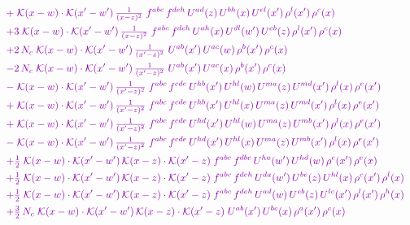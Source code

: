 \documentclass[10pt]{article}
\numberwithin{equation}{section}
\begin{document}
\begin{align}
&\quad{\color{CC}+\;\mathcal{K}(x-w)\cdot\mathcal{K}(x'-w')\,\tfrac{1}{(x-z)^{2}}\;f^{abc}\,f^{deh}\,U^{ad}(z)\,U^{bh}(x)\,U^{el}(x')\,\rho^{l}(x')\,\rho^{c}(x)}\notag\\
&\quad{\color{CC}+3\;\mathcal{K}(x-w)\cdot\mathcal{K}(x'-w')\,\tfrac{1}{(x-z)^{2}}\;f^{abc}\,f^{deh}\,U^{ah}(x)\,U^{dl}(w')\,U^{eb}(z)\,\rho^{l}(x')\,\rho^{c}(x)}\notag\\
&\quad{\color{CC}+2\,N_c\;\mathcal{K}(x-w)\cdot\mathcal{K}(x'-w')\,\tfrac{1}{(x'-z)^{2}}\;U^{ab}(x')\,U^{ac}(w)\,\rho^{b}(x')\,\rho^{c}(x)}\notag\\
&\quad{\color{CC}-2\,N_c\;\mathcal{K}(x-w)\cdot\mathcal{K}(x'-w')\,\tfrac{1}{(x'-z)^{2}}\;U^{ab}(x')\,U^{ac}(x)\,\rho^{b}(x')\,\rho^{c}(x)}\notag\\
&\quad{\color{CC}-\;\mathcal{K}(x-w)\cdot\mathcal{K}(x'-w')\,\tfrac{1}{(x'-z)^{2}}\;f^{abc}\,f^{cde}\,U^{hb}(x')\,U^{hl}(w)\,U^{ma}(z)\,U^{md}(x')\,\rho^{l}(x)\,\rho^{e}(x')}\notag\\
&\quad{\color{CC}+\;\mathcal{K}(x-w)\cdot\mathcal{K}(x'-w')\,\tfrac{1}{(x'-z)^{2}}\;f^{abc}\,f^{cde}\,U^{hb}(x')\,U^{hl}(x)\,U^{ma}(z)\,U^{md}(x')\,\rho^{l}(x)\,\rho^{e}(x')}\notag\\
&\quad{\color{CC}+\;\mathcal{K}(x-w)\cdot\mathcal{K}(x'-w')\,\tfrac{1}{(x'-z)^{2}}\;f^{abc}\,f^{cde}\,U^{hd}(x')\,U^{hl}(w)\,U^{ma}(z)\,U^{mb}(x')\,\rho^{l}(x)\,\rho^{e}(x')}\notag\\
&\quad{\color{CC}-\;\mathcal{K}(x-w)\cdot\mathcal{K}(x'-w')\,\tfrac{1}{(x'-z)^{2}}\;f^{abc}\,f^{cde}\,U^{hd}(x')\,U^{hl}(x)\,U^{ma}(z)\,U^{mb}(x')\,\rho^{l}(x)\,\rho^{e}(x')}\notag\\
&\quad{\color{CC}+\tfrac{1}{2}\;\mathcal{K}(x-w)\cdot\mathcal{K}(x'-w')\,\mathcal{K}(x-z)\cdot\mathcal{K}(x'-z)\;f^{abc}\,f^{dbe}\,U^{ha}(w')\,U^{hd}(w)\,\rho^{c}(x')\,\rho^{e}(x)}\notag\\
&\quad{\color{CC}+\tfrac{1}{2}\;\mathcal{K}(x-w)\cdot\mathcal{K}(x'-w')\,\mathcal{K}(x-z)\cdot\mathcal{K}(x'-z)\;f^{abc}\,f^{deh}\,U^{da}(w')\,U^{be}(z)\,U^{hl}(x)\,\rho^{c}(x')\,\rho^{l}(x)}\notag\\
&\quad{\color{CC}+\tfrac{1}{2}\;\mathcal{K}(x-w)\cdot\mathcal{K}(x'-w')\,\mathcal{K}(x-z)\cdot\mathcal{K}(x'-z)\;f^{abc}\,f^{deh}\,U^{ad}(w)\,U^{eb}(z)\,U^{lc}(x')\,\rho^{l}(x')\,\rho^{h}(x)}\notag\\
&\quad{\color{CC}+\tfrac{3}{2}\,N_c\;\mathcal{K}(x-w)\cdot\mathcal{K}(x'-w')\,\mathcal{K}(x-z)\cdot\mathcal{K}(x'-z)\;U^{ab}(x')\,U^{bc}(x)\,\rho^{a}(x')\,\rho^{c}(x)}\notag\\

\end{align}
\end{document}

